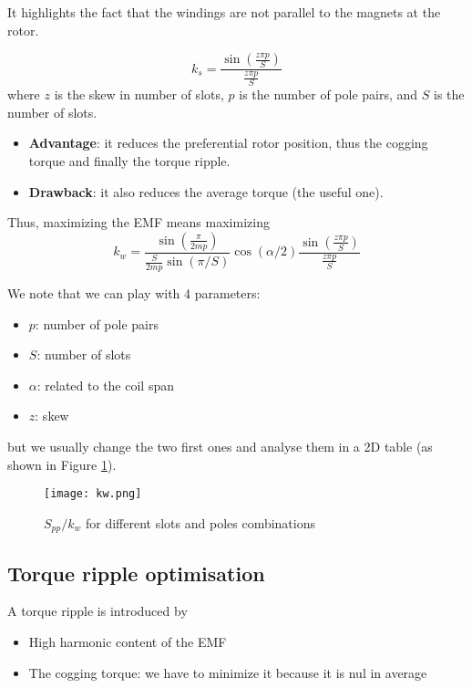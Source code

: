 It highlights the fact that the windings are not parallel to the magnets at the rotor.

\[
    k_s = \frac{\sin\left(\frac{z\pi p}{S}\right)}{\frac{z\pi p}{S}}
\]
where $z$ is the skew in number of slots, $p$ is the number of pole pairs, and $S$ is the number of slots.

\begin{itemize}
    \item \textbf{Advantage}: it reduces the preferential rotor position, thus the cogging torque and finally the torque ripple.
    \item \textbf{Drawback}: it also reduces the average torque (the useful one).
\end{itemize}

Thus, maximizing the EMF means maximizing
\[
    k_w = \frac{\sin\left(\frac{\pi}{2mp}\right)}{\frac{S}{2mp}\sin(\pi/S)} \cos(\alpha/2) \frac{\sin\left(\frac{z\pi p}{S}\right)}{\frac{z\pi p}{S}}
\]

We note that we can play with 4 parameters: \begin{itemize}
    \item $p$: number of pole pairs
    \item $S$: number of slots
    \item $\alpha$: related to the coil span
    \item $z$: skew
\end{itemize}
but we usually change the two first ones and analyse them in a 2D table (as shown in Figure \ref{fig:kw}).

\begin{figure}[H]
    \centering
    \texttt{[image: kw.png]}
    \caption{$S_{pp}/k_w$ for different slots and poles combinations}
    \label{fig:kw}
\end{figure}

\subsection{Torque ripple optimisation}

A torque ripple is introduced by

\begin{itemize}
    \item High harmonic content of the EMF
    \item The cogging torque: we have to minimize it because it is nul in average
\end{itemize}

